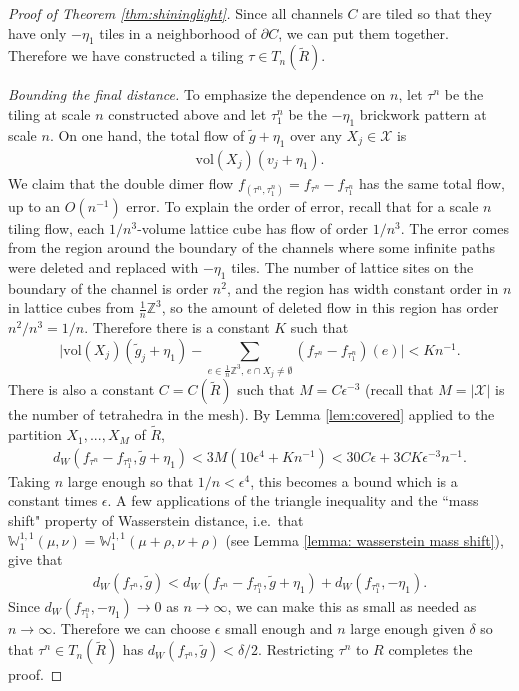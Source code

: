 \documentclass[11pt]{article}
\theoremstyle{remark}
\theoremstyle{definition}
\newcommand{\mc}[1]{\mathcal{#1}}
\newcommand{\m}[1]{\mathbb{#1}}
\begin{document}
\begin{proof}[Proof of Theorem \ref{thm:shininglight}]
Since all channels $C$ are tiled so that they have only $-\eta_1$ tiles in a neighborhood of $\partial C$, we can put them together. Therefore we have constructed a tiling $\tau\in T_n(\widetilde R)$. 

\textit{Bounding the final distance.} To emphasize the dependence on $n$, let $\tau^n$ be the tiling at scale $n$ constructed above and let $\tau_1^n$ be the $-\eta_1$ brickwork pattern at scale $n$. On one hand, the total flow of $\widetilde g+ \eta_1$ over any $X_j\in \mc X$ is 
\begin{align*}
    \text{vol}(X_j) (v_j + \eta_1).
\end{align*}
We claim that the double dimer flow $f_{(\tau^n,\tau_1^n)}= f_{\tau^n}-f_{\tau_1^n}$ has the same total flow, up to an $O(n^{-1})$ error. To explain the order of error, recall that for a scale $n$ tiling flow, each $1/n^3$-volume lattice cube has flow of order $1/n^3$. The error comes from the region around the boundary of the channels where some infinite paths were deleted and replaced with $-\eta_1$ tiles. The number of lattice sites on the boundary of the channel is order $n^2$, and the region has width constant order in $n$ in lattice cubes from $\frac{1}{n} \m Z^3$, so the amount of deleted flow in this region has order $n^2/n^3 = 1/n$. Therefore there is a constant $K$ such that 
$$\bigg|  \text{vol}(X_j)(\widetilde g_j +\eta_1) -\sum_{e\in \frac{1}{n}\m Z^3,\, e\cap X_j\neq \emptyset} (f_{\tau^n} - f_{\tau_1^n})(e)\bigg| < K n^{-1}.$$
There is also a constant $C= C(\widetilde R)$ such that $M = C \epsilon^{-3}$ (recall that $M=|\mc X|$ is the number of tetrahedra in the mesh). By Lemma \ref{lem:covered} applied to the partition $X_1,...,X_M$ of $\widetilde R$, 
\begin{align*}
	d_W(f_{\tau^n}-f_{\tau_1^n}, \widetilde g +  \eta_1) < 3M ( 10 \epsilon^{4} + K n^{-1}) < 30 C \epsilon + 3 C K \epsilon^{-3} n^{-1}.
\end{align*}
Taking $n$ large enough so that $1/n<\epsilon^4$, this becomes a bound which is a constant times $\epsilon$. A few applications of the triangle inequality and the ``mass shift" property of Wasserstein distance, i.e.\ that $\m W_1^{1,1}(\mu,\nu) = \m W_1^{1,1}(\mu+\rho,\nu+\rho)$ (see Lemma \ref{lemma: wasserstein mass shift}), give that 
\begin{align*}
    d_W(f_{\tau^n}, \widetilde g) < d_W(f_{\tau^n}- f_{\tau_1^n},\widetilde g+\eta_1) + d_W(f_{\tau_1^n},-\eta_1).
\end{align*}
Since $d_W(f_{\tau_1^n},-\eta_1)\to 0$ as $n\to \infty$, we can make this as small as needed as $n\to \infty$. Therefore we can choose $\epsilon$ small enough and $n$ large enough given $\delta$ so that $\tau^n\in T_n(\widetilde R)$ has $d_W(f_{\tau^n},\widetilde g)<\delta/2$. Restricting $\tau^n$ to $R$ completes the proof. 
\end{proof}
\end{document}
